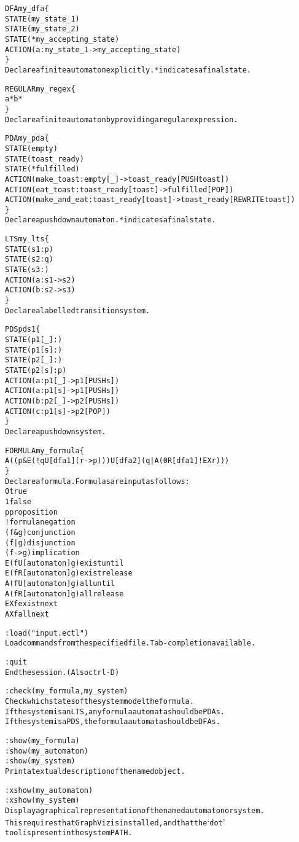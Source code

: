 \documentclass[11pt]{article}
\theoremstyle{definition}
\begin{document}
\begin{alltt}
DFA my_dfa \{
   STATE(  my_state_1 )
   STATE(  my_state_2 )
   STATE( *my_accepting_state )
   ACTION( a : my_state_1 -> my_accepting_state )
\}
Declare a finite automaton explicitly. * indicates a final state.


REGULAR my_regex \{
	a* b*
\}
Declare a finite automaton by providing a regular expression.


PDA my_pda \{
   STATE ( empty )
   STATE ( toast_ready )
   STATE ( *fulfilled )
   ACTION ( make_toast: empty[_] -> toast_ready[PUSH toast] )
   ACTION ( eat_toast: toast_ready[toast] -> fulfilled[POP] )
   ACTION ( make_and_eat: toast_ready[toast] -> toast_ready[REWRITE toast] )
\}
Declare a pushdown automaton. * indicates a final state.


LTS my_lts \{
   STATE ( s1: p )
   STATE ( s2: q )
   STATE ( s3: )
   ACTION ( a: s1 -> s2 )
   ACTION ( b: s2 -> s3 )
\}
Declare a labelled transition system.


PDS pds1 \{
	STATE( p1[_] : )
	STATE( p1[s] : )
	STATE( p2[_] : )
	STATE( p2[s] : p)
	ACTION( a: p1[_] -> p1[PUSH s] )
	ACTION( a: p1[s] -> p1[PUSH s] )
	ACTION( b: p2[_] -> p2[PUSH s] )
	ACTION( c: p1[s] -> p2[POP] )
\}
Declare a pushdown system.


FORMULA my_formula \{
	A( (p & E(!q U[dfa1](r -> p))) U[dfa2] (q|A(0 R[dfa1] !EX r)) )
\}
Declare a formula.  Formulas are input as follows:
0                     true
1                     false
p                     proposition
!formula              negation
(f & g)               conjunction
(f | g)               disjunction
(f -> g)              implication
E(f U[automaton] g)   exist until
E(f R[automaton] g)   exist release
A(f U[automaton] g)   all until 
A(f R[automaton] g)   all release
EX f                  exist next 
AX f                  all next 


:load("input.ectl")
Load commands from the specified file. Tab-completion available.


:quit
End the session. (Also ctrl-D)


:check(my_formula, my_system)
Check which states of the system model the formula.
If the system is an LTS, any formula automata should be PDAs.
If the system is a PDS, the formula automata should be DFAs.


:show(my_formula)
:show(my_automaton)
:show(my_system)
Print a textual description of the named object.


:xshow(my_automaton)
:xshow(my_system)
Display a graphical representation of the named automaton or system.
This requires that GraphViz is installed, and that the `dot'
tool is present in the system PATH.
\end{alltt}
\end{document}
